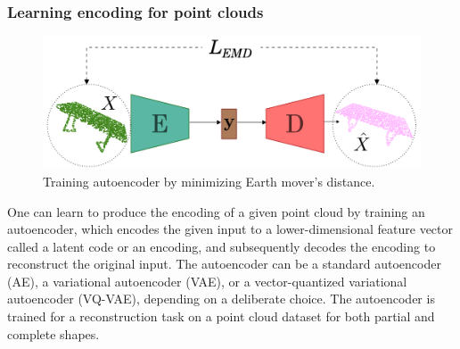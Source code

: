         \subsubsection{Learning encoding for point clouds}
        \begin{figure}[htb]
          \begin{center}
          \includegraphics[width=\linewidth]{figures/emd_ae.png}
          \end{center}
          \caption{Training autoencoder by minimizing Earth mover's distance.}\label{fig:emd_ae}
        \end{figure}
        One can learn to produce the encoding of a given point cloud by training an autoencoder, which encodes the given input to a lower-dimensional feature vector called a latent code or an encoding, and subsequently decodes the encoding to reconstruct the original input. The autoencoder can be a standard autoencoder (AE), a variational autoencoder (VAE), or a vector-quantized variational autoencoder (VQ-VAE), depending on a deliberate choice. The autoencoder is trained for a reconstruction task on a point cloud dataset for both partial and complete shapes.
        \newline
        
